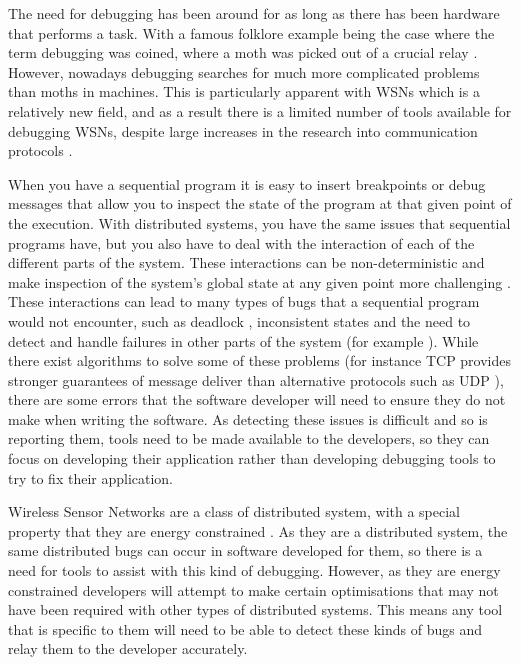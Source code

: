 \documentclass[a4paper]{article}
\begin{document}
The need for debugging has been around for as long as there has been hardware that performs a task. With a famous folklore example being the case where the term debugging was coined, where a moth was picked out of a crucial relay \cite{shapiro1987etymology}. However, nowadays debugging searches for much more complicated problems than moths in machines. This is particularly apparent with WSNs which is a relatively new field, and as a result there is a limited number of tools available for debugging WSNs, despite large increases in the research into communication protocols \cite{TankBible}. 

When you have a sequential program it is easy to insert breakpoints or debug messages that allow you to inspect the state of the program at that given point of the execution. With distributed systems, you have the same issues that sequential programs have, but you also have to deal with the interaction of each of the different parts of the system. These interactions can be non-deterministic \cite{liu2007wids} and make inspection of the system's global state at any given point more challenging \cite{chandy1985distributed}. These interactions can lead to many types of bugs that a sequential program would not encounter, such as deadlock \cite{singhal1989deadlock}, inconsistent states \cite{chandy1985distributed} and the need to detect and handle failures in other parts of the system (for example \cite{5623434}). While there exist algorithms to solve some of these problems (for instance TCP provides stronger guarantees of message deliver than alternative protocols such as UDP \cite[p.~532]{Tanenbaum:2002:CN:572404}), there are some errors that the software developer will need to ensure they do not make when writing the software. As detecting these issues is difficult and so is reporting them, tools need to be made available to the developers, so they can focus on developing their application rather than developing debugging tools to try to fix their application.

Wireless Sensor Networks are a class of distributed system, with a special property that they are energy constrained \cite{6023235}.  As they are a distributed system, the same distributed bugs can occur in software developed for them, so there is a need for tools to assist with this kind of debugging. However, as they are energy constrained developers will attempt to make certain optimisations that may not have been required with other types of distributed systems. This means any tool that is specific to them will need to be able to detect these kinds of bugs and relay them to the developer accurately.
\end{document}
